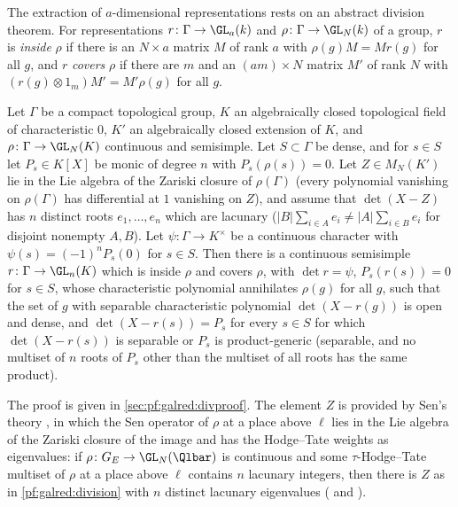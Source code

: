 The extraction of $a$-dimensional representations rests on an abstract division theorem. For representations
$r\colon\Gamma\to\GL_a(k)$ and $\rho\colon\Gamma\to\GL_N(k)$ of a group, $r$ is \emph{inside} $\rho$ if there is an
$N\times a$ matrix $M$ of rank $a$ with $\rho(g)M=Mr(g)$ for all $g$, and $r$ \emph{covers} $\rho$ if there are $m$ and an
$(am)\times N$ matrix $M'$ of rank $N$ with $(r(g)\otimes1_m)M'=M'\rho(g)$ for all $g$.

\begin{theorem}[Division]\label{pf:galred:division}
Let $\Gamma$ be a compact topological group, $K$ an algebraically closed topological field of characteristic $0$, $K'$
an algebraically closed extension of $K$, and $\rho\colon\Gamma\to\GL_N(K)$ continuous and semisimple. Let
$S\subset\Gamma$ be dense, and for $s\in S$ let $P_s\in K[X]$ be monic of degree $n$ with $P_s(\rho(s))=0$. Let $Z\in
M_N(K')$ lie in the Lie algebra of the Zariski closure of $\rho(\Gamma)$ (every polynomial vanishing on $\rho(\Gamma)$ has
differential at $1$ vanishing on $Z$), and assume that $\det(X-Z)$ has $n$ distinct roots $e_1,\dots,e_n$ which are
lacunary ($|B|\sum_{i\in A}e_i\ne|A|\sum_{i\in B}e_i$ for disjoint nonempty $A,B$). Let $\psi\colon\Gamma\to K^\times$ be a
continuous character with $\psi(s)=(-1)^nP_s(0)$ for $s\in S$. Then there is a continuous semisimple $r\colon
\Gamma\to\GL_n(K)$ which is inside $\rho$ and covers $\rho$, with $\det r=\psi$, $P_s(r(s))=0$ for $s\in S$, whose
characteristic polynomial annihilates $\rho(g)$ for all $g$, such that the set of $g$ with separable characteristic
polynomial $\det(X-r(g))$ is open and dense, and $\det(X-r(s))=P_s$ for every $s\in S$ for which $\det(X-r(s))$ is
separable or $P_s$ is product-generic (separable, and no multiset of $n$ roots of $P_s$ other than the multiset of all roots
has the same product).
\end{theorem}

The proof is given in \cref{sec:pf:galred:divproof}. The element $Z$ is provided by Sen's theory \cite{Sen1980}, in which the
Sen operator of $\rho$ at a place above $\ell$ lies in the Lie algebra of the Zariski closure of the image and has the
Hodge--Tate weights as eigenvalues: if $\rho\colon G_E\to\GL_N(\Qlbar)$ is continuous and some $\tau$-Hodge--Tate multiset
of $\rho$ at a place above $\ell$ contains $n$ lacunary integers, then there is $Z$ as in \cref{pf:galred:division} with
$n$ distinct lacunary eigenvalues
( and ).

